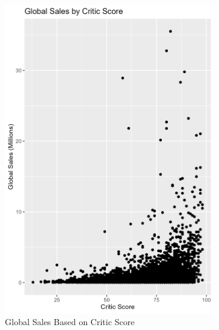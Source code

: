 \documentclass[12pt,english]{article}
\begin{document}
\begin{figure}[ht]
\centering
\begin{subfigure}{0.49\linewidth}
    \centering
    \includegraphics[width=\linewidth]{Figures/sales_critic_score.png}
    \caption{Global Sales Based on Critic Score}
    \label{fig:fig5}
\end{subfigure}
\begin{subfigure}{0.49\linewidth}
    \centering

\end{subfigure}
\end{figure}
\end{document}
